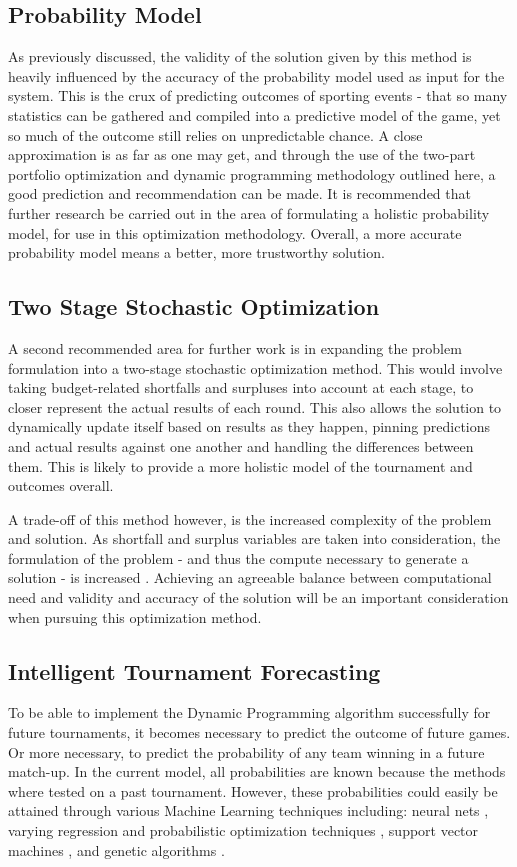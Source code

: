 \documentclass[12pt]{article}
\begin{document}
\subsection{Probability Model}
As previously discussed, the validity of the solution given by this method is heavily influenced by the accuracy of the probability model used as input for the system.
This is the crux of predicting outcomes of sporting events - that so many statistics can be gathered and compiled into a predictive model of the game, yet so much of the outcome still relies on unpredictable chance.
A close approximation is as far as one may get, and through the use of the two-part portfolio optimization and dynamic programming methodology outlined here, a good prediction and recommendation can be made.
It is recommended that further research be carried out in the area of formulating a holistic probability model, for use in this optimization methodology.
Overall, a more accurate probability model means a better, more trustworthy solution.

\subsection{Two Stage Stochastic Optimization}
A second recommended area for further work is in expanding the problem formulation into a two-stage stochastic optimization method.
This would involve taking budget-related shortfalls and surpluses into account at each stage, to closer represent the actual results of each round.
This also allows the solution to dynamically update itself based on results as they happen, pinning predictions and actual results against one another and handling the differences between them.
This is likely to provide a more holistic model of the tournament and outcomes overall.

A trade-off of this method however, is the increased complexity of the problem and solution.
As shortfall and surplus variables are taken into consideration, the formulation of the problem - and thus the compute necessary to generate a solution - is increased \cite{robinson1987stability}.
Achieving an agreeable balance between computational need and validity and accuracy of the solution will be an important consideration when pursuing this optimization method.

\subsection{Intelligent Tournament Forecasting}
To be able to implement the Dynamic Programming algorithm successfully for future tournaments, it becomes necessary to predict the outcome of future games.
Or more necessary, to predict the probability of any team winning in a future match-up.
In the current model, all probabilities are known because the methods where tested on a past tournament.
However, these probabilities could easily be attained through various Machine Learning techniques including: neural nets \cite{KarlLeswing}, varying regression and probabilistic optimization techniques \cite{adams-dahl-murray-2010a, DannyTarlow, BradyWest, BradleyCarlin, ProbModelsNCAA-1991, MoreProbModelsNCAA-1996}, support vector machines \cite{KennethDeakins}, and genetic algorithms \cite{ScottTurner}.
\end{document}
